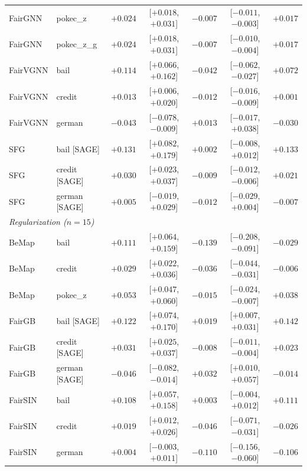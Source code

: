 \begin{table}[t]
\begin{tabular}{llrcrcr}
FairGNN & pokec\_z & $+0.024$ & [$+0.018$, $+0.031$] & $-0.007$ & [$-0.011$, $-0.003$] & $+0.017$ \\
FairGNN & pokec\_z\_g & $+0.024$ & [$+0.018$, $+0.031$] & $-0.007$ & [$-0.010$, $-0.004$] & $+0.017$ \\
\midrule
FairVGNN & bail & $+0.114$ & [$+0.066$, $+0.162$] & $\mathbf{-0.042}$ & [$-0.062$, $-0.027$] & $+0.072$ \\
FairVGNN & credit & $+0.013$ & [$+0.006$, $+0.020$] & $\mathbf{-0.012}$ & [$-0.016$, $-0.009$] & $+0.001$ \\
FairVGNN & german & $-0.043$ & [$-0.078$, $-0.009$] & $+0.013$ & [$-0.017$, $+0.038$] & $-0.030$ \\
\midrule
SFG & bail [SAGE] & $+0.131$ & [$+0.082$, $+0.179$] & $+0.002$ & [$-0.008$, $+0.012$] & $+0.133$ \\
SFG & credit [SAGE] & $+0.030$ & [$+0.023$, $+0.037$] & $-0.009$ & [$-0.012$, $-0.006$] & $+0.021$ \\
SFG & german [SAGE] & $+0.005$ & [$-0.019$, $+0.029$] & $-0.012$ & [$-0.029$, $+0.004$] & $-0.007$ \\
\midrule
\multicolumn{7}{l}{\textit{Regularization ($n=15$)}} \\
BeMap & bail & $+0.111$ & [$+0.064$, $+0.159$] & $\mathbf{-0.139}$ & [$-0.208$, $-0.091$] & $-0.029$ \\
BeMap & credit & $+0.029$ & [$+0.022$, $+0.036$] & $\mathbf{-0.036}$ & [$-0.044$, $-0.031$] & $-0.006$ \\
BeMap & pokec\_z & $+0.053$ & [$+0.047$, $+0.060$] & $\mathbf{-0.015}$ & [$-0.024$, $-0.007$] & $+0.038$ \\
\midrule
FairGB & bail [SAGE] & $+0.122$ & [$+0.074$, $+0.170$] & $\mathbf{+0.019}$ & [$+0.007$, $+0.031$] & $+0.142$ \\
FairGB & credit [SAGE] & $+0.031$ & [$+0.025$, $+0.037$] & $-0.008$ & [$-0.011$, $-0.004$] & $+0.023$ \\
FairGB & german [SAGE] & $-0.046$ & [$-0.082$, $-0.014$] & $\mathbf{+0.032}$ & [$+0.010$, $+0.057$] & $-0.014$ \\
\midrule
FairSIN & bail & $+0.108$ & [$+0.057$, $+0.158$] & $+0.003$ & [$-0.004$, $+0.012$] & $+0.111$ \\
FairSIN & credit & $+0.019$ & [$+0.012$, $+0.026$] & $\mathbf{-0.046}$ & [$-0.071$, $-0.031$] & $-0.026$ \\
FairSIN & german & $+0.004$ & [$-0.003$, $+0.011$] & $\mathbf{-0.110}$ & [$-0.156$, $-0.060$] & $-0.106$ \\

\end{tabular}
\end{table}
